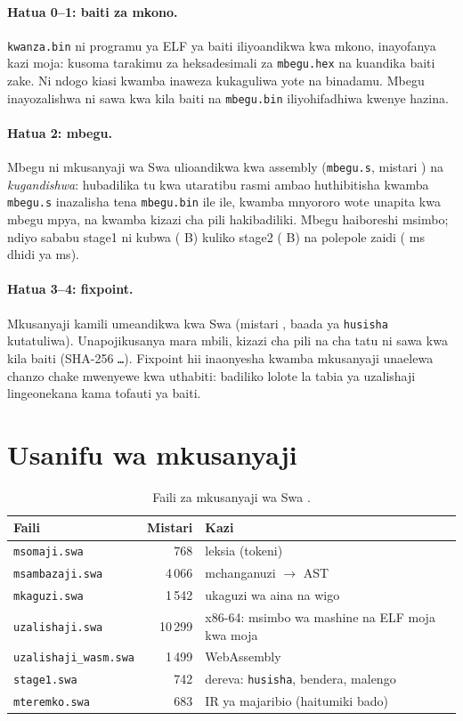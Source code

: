 \documentclass[11pt,a4paper]{article}
\begin{document}
\paragraph{Hatua 0--1: baiti za mkono.} \texttt{kwanza.bin} ni programu ya ELF ya baiti \KwanzaBaiti{} iliyoandikwa kwa mkono, inayofanya kazi moja: kusoma tarakimu za heksadesimali za \texttt{mbegu.hex} na kuandika baiti zake. Ni ndogo kiasi kwamba inaweza kukaguliwa yote na binadamu. Mbegu inayozalishwa ni sawa kwa kila baiti na \texttt{mbegu.bin} iliyohifadhiwa kwenye hazina.

\paragraph{Hatua 2: mbegu.} Mbegu ni mkusanyaji wa Swa ulioandikwa kwa assembly (\texttt{mbegu.s}, mistari \MbeguMistari) na \emph{kugandishwa}: hubadilika tu kwa utaratibu rasmi ambao huthibitisha kwamba \texttt{mbegu.s} inazalisha tena \texttt{mbegu.bin} ile ile, kwamba mnyororo wote unapita kwa mbegu mpya, na kwamba kizazi cha pili hakibadiliki. Mbegu haiboreshi msimbo; ndiyo sababu stage1 ni kubwa (\StageMojaBaiti{} B) kuliko stage2 (\StageMbiliBaiti{} B) na polepole zaidi (\MudaStageMoja{} ms dhidi ya \MudaStageMbili{} ms).

\paragraph{Hatua 3--4: fixpoint.} Mkusanyaji kamili umeandikwa kwa Swa (mistari \MkusanyajiMistari{}, \ZimaMistari{} baada ya \texttt{husisha} kutatuliwa). Unapojikusanya mara mbili, kizazi cha pili na cha tatu ni sawa kwa kila baiti (SHA-256 \texttt{\ShaFixpoint\ldots}). Fixpoint hii inaonyesha kwamba mkusanyaji unaelewa chanzo chake mwenyewe kwa uthabiti: badiliko lolote la tabia ya uzalishaji lingeonekana kama tofauti ya baiti.

\section{Usanifu wa mkusanyaji}\label{sec:usanifu}

\begin{table}[h]
\centering
\begin{tabular}{@{}lrl@{}}
\toprule
Faili & Mistari & Kazi \\
\midrule
\texttt{msomaji.swa} & 768 & leksia (tokeni) \\
\texttt{msambazaji.swa} & 4\,066 & mchanganuzi $\to$ AST \\
\texttt{mkaguzi.swa} & 1\,542 & ukaguzi wa aina na wigo \\
\texttt{uzalishaji.swa} & 10\,299 & x86-64: msimbo wa mashine na ELF moja kwa moja \\
\texttt{uzalishaji\_wasm.swa} & 1\,499 & WebAssembly \\
\texttt{stage1.swa} & 742 & dereva: \texttt{husisha}, bendera, malengo \\
\texttt{mteremko.swa} & 683 & IR ya majaribio (haitumiki bado) \\
\bottomrule
\end{tabular}
\caption{Faili za mkusanyaji wa Swa \Toleo.}
\end{table}
\end{document}
